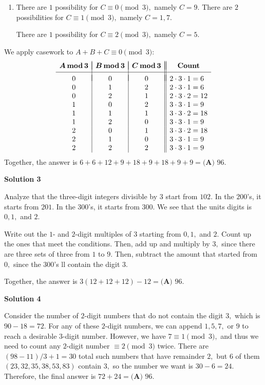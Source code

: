 \begin{enumerate}
\begin{enumerate}
        \item There are $1$ possibility for $C\equiv0\pmod3,$ namely $C=9.$ There are $2$ possibilities for $C\equiv1\pmod3,$ namely $C=1,7.$ 

 There are $1$ possibility for $C\equiv2\pmod3,$ namely $C=5.$

            \end{enumerate}
            We apply casework to $A+B+C\equiv0\pmod3:$
 \[\begin{array}{c|c|c||l} & & & \\ [-2.5ex] \boldsymbol{A\operatorname{mod}3} & \boldsymbol{B\operatorname{mod}3} & \boldsymbol{C\operatorname{mod}3} & \multicolumn{1}{c}{\textbf{Count}} \\ [0.5ex] \hline & & &  \\ [-2ex] 0 & 0 & 0 & 2\cdot3\cdot1=6 \\ 0 & 1 & 2 & 2\cdot3\cdot1=6 \\ 0 & 2 & 1 & 2\cdot3\cdot2=12 \\ 1 & 0 & 2 & 3\cdot3\cdot1=9 \\ 1 & 1 & 1 & 3\cdot3\cdot2=18 \\ 1 & 2 & 0 & 3\cdot3\cdot1=9 \\ 2 & 0 & 1 & 3\cdot3\cdot2=18 \\ 2 & 1 & 0 & 3\cdot3\cdot1=9 \\ 2 & 2 & 2 & 3\cdot3\cdot1=9 \end{array}\]Together, the answer is $6+6+12+9+18+9+18+9+9=\boxed{\textbf{(A) } 96}.$




\textbf{Solution 3}

Analyze that the three-digit integers divisible by $3$ start from $102.$ In the $200$'s, it starts from $201.$ In the $300$'s, it starts from $300.$ We see that the units digits is $0, 1,$ and $2.$

 Write out the $1$- and $2$-digit multiples of $3$ starting from $0, 1,$ and $2.$ Count up the ones that meet the conditions. Then, add up and multiply by $3,$ since there are three sets of three from $1$ to $9.$ Then, subtract the amount that started from $0,$ since the $300$'s ll contain the digit $3.$

 Together, the answer is $3(12+12+12)-12=\boxed{\textbf{(A) } 96}.$




\textbf{Solution 4}

Consider the number of $2$-digit numbers that do not contain the digit $3,$ which is $90-18=72.$ For any of these $2$-digit numbers, we can append $1,5,7,$ or $9$ to reach a desirable $3$-digit number. However, we have $7 \equiv 1\pmod{3},$ and thus we need to count any $2$-digit number $\equiv 2\pmod{3}$ twice. There are $(98-11)/3+1=30$ total such numbers that have remainder $2,$ but $6$ of them $(23,32,35,38,53,83)$ contain $3,$ so the number we want is $30-6=24.$ Therefore, the final answer is $72+24= \boxed{\textbf{(A) } 96}.$





\end{enumerate}
